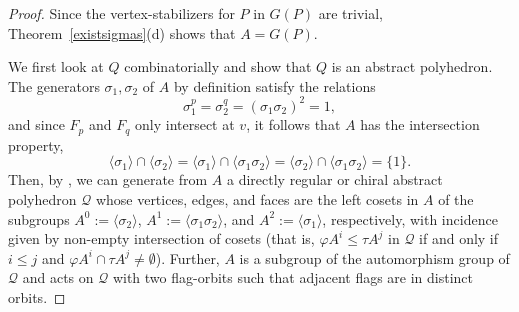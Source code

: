 \documentclass[12pt]{article}
\theoremstyle{definition}\newtheorem{definition}{Definition}[section]
\begin{document}
\begin{proof}
Since the vertex-stabilizers for $P$ in $G(P)$ are trivial, Theorem~\ref{existsigmas}(d) shows that $A=G(P)$. 

We first look at $Q$ combinatorially and show that $Q$ is an abstract polyhedron. The generators $\sigma_1,\sigma_2$ of $A$ by definition satisfy the relations $$\sigma_1^p = \sigma_2^q = (\sigma_1\sigma_2)^2 = 1,$$ 
and since $F_p$ and $F_q$ only intersect at $v$, it follows that $A$ has the intersection property,
$$\langle \sigma_1 \rangle \cap \langle \sigma_2 \rangle 
=\langle \sigma_1 \rangle \cap \langle \sigma_1\sigma_2 \rangle 
=\langle \sigma_2 \rangle \cap \langle \sigma_1\sigma_2 \rangle = \{1\}.$$ 
Then, by \cite{Chiral abstract polytopes}, we can generate from $A$ a directly regular or chiral abstract polyhedron $\mathcal{Q}$ whose vertices, edges, and faces  are the left cosets in $A$ of the subgroups $A^0:=\langle \sigma_2 \rangle$, $A^1:=\langle \sigma_1\sigma_2 \rangle$, and $A^2:=\langle \sigma_1 \rangle$, respectively, with incidence given by non-empty intersection of cosets (that is, $\varphi A^i \leq \tau A^j$ in $\mathcal{Q}$ if and only if $i\leq j$ and $\varphi A^i \cap \tau A^j \neq \emptyset$). Further, $A$ is a subgroup of the automorphism group of $\mathcal{Q}$ and acts on $\mathcal{Q}$ with two flag-orbits such that adjacent flags are in distinct orbits. \smallskip


\end{proof}
\end{document}
